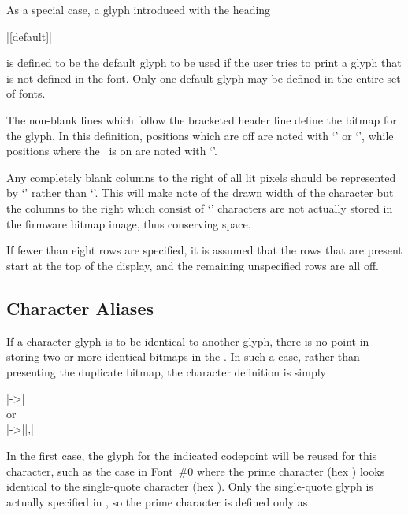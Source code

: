 As a special case, a glyph introduced with the heading
\begin{center}
	\begin{Coding}
		|[default]|
	\end{Coding}
\end{center}
is defined to be the default glyph to be used if the user
tries to print a glyph that is not defined in the font. Only
one default glyph may be defined in the entire set of fonts.

The non-blank lines which follow the bracketed header line define
the bitmap for the glyph. In this definition, positions which are off
are noted with `' or `\z{|}', while positions where the \led\ is
on are noted with `'.

Any completely blank columns to the right of all lit pixels should be
represented by `\z{|}' rather than `'. This will make note of the drawn
width of the character but the columns to the right which consist of `\z{|}'
characters are not actually stored in the firmware bitmap image, thus conserving
 space.

If fewer than eight rows are specified, it is assumed that the rows that are present
start at the top of the display, and the remaining unspecified rows are all off.

\subsection{Character Aliases}
If a character glyph is to be identical to another glyph, there is no point
in storing two or more identical bitmaps in the . In such a case,
rather than presenting the duplicate bitmap, the character definition
is simply
\begin{center}
	\begin{Coding}
		|->|\\
		or\\
		|->||,|
	\end{Coding}
\end{center}
In the first case, the glyph for the indicated codepoint will be reused for this character,
such as the case in Font~\#0 where the prime character (hex ) looks identical to
the single-quote character (hex ). Only the single-quote glyph is actually specified
in , so the prime character is defined only as

